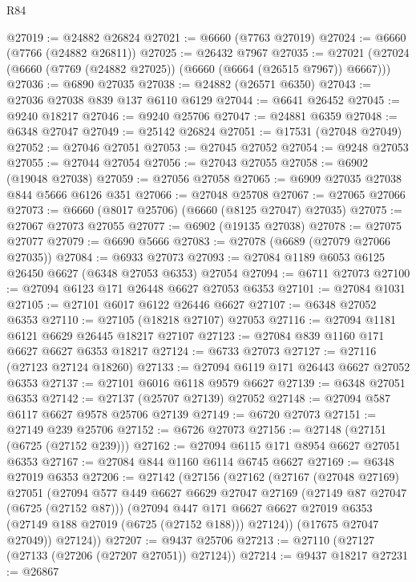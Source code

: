 \begin{lexlean}{R84}
\begin{coremodule}
@27019 := @24882 @26824
@27021 := @6660 (@7763 @27019)
@27024 := @6660 (@7766 (@24882 @26811))
@27025 := @26432 @7967
@27035 := @27021 (@27024 (@6660 (@7769 (@24882 @27025)) (@6660 (@6664 (@26515 @7967)) @6667)))
@27036 := @6890 @27035
@27038 := @24882 (@26571 @6350)
@27043 := @27036 @27038 @839 @137 @6110 @6129
@27044 := @6641 @26452
@27045 := @9240 @18217
@27046 := @9240 @25706
@27047 := @24881 @6359
@27048 := @6348 @27047
@27049 := @25142 @26824
@27051 := @17531 (@27048 @27049)
@27052 := @27046 @27051
@27053 := @27045 @27052
@27054 := @9248 @27053
@27055 := @27044 @27054
@27056 := @27043 @27055
@27058 := @6902 (@19048 @27038)
@27059 := @27056 @27058
@27065 := @6909 @27035 @27038 @844 @5666 @6126 @351
@27066 := @27048 @25708
@27067 := @27065 @27066
@27073 := @6660 (@8017 @25706) (@6660 (@8125 @27047) @27035)
@27075 := @27067 @27073 @27055
@27077 := @6902 (@19135 @27038)
@27078 := @27075 @27077
@27079 := @6690 @5666
@27083 := @27078 (@6689 (@27079 @27066 @27035))
@27084 := @6933 @27073
@27093 := @27084 @1189 @6053 @6125 @26450 @6627 (@6348 @27053 @6353) @27054
@27094 := @6711 @27073
@27100 := @27094 @6123 @171 @26448 @6627 @27053 @6353
@27101 := @27084 @1031
@27105 := @27101 @6017 @6122 @26446 @6627
@27107 := @6348 @27052 @6353
@27110 := @27105 (@18218 @27107) @27053
@27116 := @27094 @1181 @6121 @6629 @26445 @18217 @27107
@27123 := @27084 @839 @1160 @171 @6627 @6627 @6353 @18217
@27124 := @6733 @27073
@27127 := @27116 (@27123 @27124 @18260)
@27133 := @27094 @6119 @171 @26443 @6627 @27052 @6353
@27137 := @27101 @6016 @6118 @9579 @6627
@27139 := @6348 @27051 @6353
@27142 := @27137 (@25707 @27139) @27052
@27148 := @27094 @587 @6117 @6627 @9578 @25706 @27139
@27149 := @6720 @27073
@27151 := @27149 @239 @25706
@27152 := @6726 @27073
@27156 := @27148 (@27151 (@6725 (@27152 @239)))
@27162 := @27094 @6115 @171 @8954 @6627 @27051 @6353
@27167 := @27084 @844 @1160 @6114 @6745 @6627
@27169 := @6348 @27019 @6353
@27206 := @27142
    (@27156
      (@27162
        (@27167
          (@27048 @27169)
          @27051
          (@27094
            @577
            @449
            @6627
            @6629
            @27047
            @27169
            (@27149 @87 @27047 (@6725 (@27152 @87)))
            (@27094
              @447
              @171
              @6627
              @6627
              @27019
              @6353
              (@27149 @188 @27019 (@6725 (@27152 @188)))
              @27124))
          (@17675 @27047 @27049))
        @27124))
@27207 := @9437 @25706
@27213 := @27110 (@27127 (@27133 (@27206 (@27207 @27051)) @27124))
@27214 := @9437 @18217
@27231 := @26867

\end{coremodule}
\end{lexlean}
